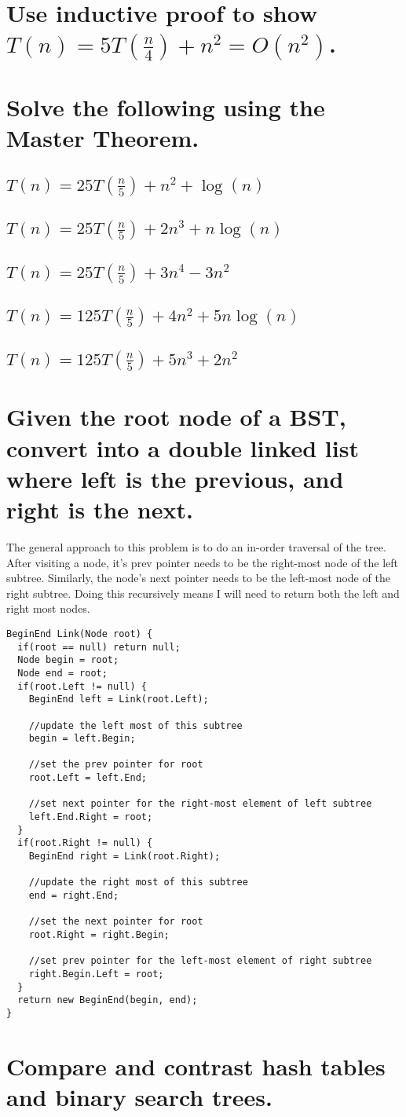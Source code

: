 \documentclass{article}
\begin{document}
\section{Use inductive proof to show \(T(n) = 5T(\frac{n}{4}) + n^2 = O(n^2)\).}

\section{Solve the following using the Master Theorem.}
    \subsection{\(T(n) = 25T(\frac{n}{5}) + n^2 + \log(n)\)}
    \subsection{\(T(n) = 25T(\frac{n}{5}) + 2n^3 + n \log(n)\)}
    \subsection{\(T(n) = 25T(\frac{n}{5}) + 3n^4 - 3n^2\)}
    \subsection{\(T(n) = 125T(\frac{n}{5}) + 4n^2 + 5n \log(n)\)}
    \subsection{\(T(n) = 125T(\frac{n}{5}) + 5n^3 + 2n^2\)}

\section{Given the root node of a BST, convert into a double linked list where left is the previous, and right is the next.}
The general approach to this problem is to do an in-order traversal of the tree.
After visiting a node, it's prev pointer needs to be the right-most node of the left subtree.
Similarly, the node's next pointer needs to be the left-most node of the right subtree.
Doing this recursively means I will need to return both the left and right most nodes.
\begin{lstlisting}
BeginEnd Link(Node root) {
  if(root == null) return null;
  Node begin = root;
  Node end = root;
  if(root.Left != null) {
    BeginEnd left = Link(root.Left);

    //update the left most of this subtree
    begin = left.Begin; 

    //set the prev pointer for root
    root.Left = left.End; 

    //set next pointer for the right-most element of left subtree
    left.End.Right = root; 
  }
  if(root.Right != null) {
    BeginEnd right = Link(root.Right);

    //update the right most of this subtree
    end = right.End;

    //set the next pointer for root
    root.Right = right.Begin;

    //set prev pointer for the left-most element of right subtree
    right.Begin.Left = root;
  }
  return new BeginEnd(begin, end);
}
\end{lstlisting}
\section{Compare and contrast hash tables and binary search trees.}
\end{document}
